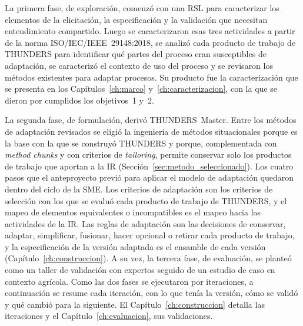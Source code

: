 \documentclass[12pt,letterpaper,oneside]{report}
\begin{document}
La primera fase, de exploración, comenzó con una RSL para caracterizar los
elementos de la elicitación, la especificación y la validación que necesitan
entendimiento compartido. Luego se caracterizaron esas tres
actividades a partir de la norma ISO/IEC/IEEE~29148:2018, se analizó cada producto de trabajo de
THUNDERS para identificar qué partes del proceso eran
susceptibles de adaptación, se caracterizó el contexto de uso del proceso y se revisaron los métodos
existentes para adaptar procesos. Su producto fue la caracterización que se
presenta en los Capítulos~\ref{ch:marco} y~\ref{ch:caracterizacion}, con la que
se dieron por cumplidos los objetivos~1 y~2.

La segunda fase, de formulación, derivó THUNDERS~Master. Entre los
métodos de adaptación revisados se eligió la ingeniería de métodos situacionales
porque es la base con la que se construyó THUNDERS y porque, complementada con
\textit{method chunks} y con criterios de \textit{tailoring}, permite conservar solo los productos de trabajo que aportan a la IR
(Sección~\ref{sec:metodo_seleccionado}). Los cuatro pasos que el anteproyecto previó para aplicar el modelo de adaptación
quedaron dentro del ciclo de la SME. Los criterios de adaptación son los
criterios de selección con
los que se evaluó cada producto de trabajo de THUNDERS, y el mapeo de elementos
equivalentes o incompatibles es el mapeo hacia las actividades de la IR. Las
reglas de adaptación son las decisiones de conservar, adaptar, simplificar,
fusionar, hacer opcional o retirar cada producto de trabajo, y la especificación de la
versión adaptada es el ensamble de cada versión
(Capítulo~\ref{ch:construccion}). A su vez, la tercera fase, de
evaluación, se planteó como un taller de validación con
expertos seguido de un estudio de caso en contexto agrícola. Como las dos fases
se ejecutaron por iteraciones, a continuación se resume cada iteración, con lo
que tenía la versión, cómo se validó y qué cambió para la siguiente. El
Capítulo~\ref{ch:construccion} detalla las iteraciones y el
Capítulo~\ref{ch:evaluacion}, sus validaciones.
\end{document}
